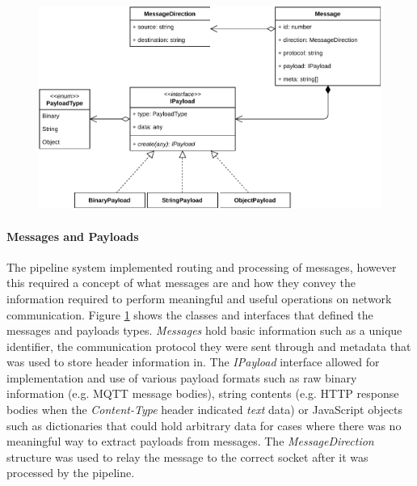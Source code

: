 \begin{figure}[h]
    \centering
    \includegraphics[width=14cm]{img/ch04/prototype/message-payload.pdf}
    \label{fig:prototype-message-payload}
\end{figure}
\paragraph{Messages and Payloads}
The pipeline system implemented routing and processing of messages, however this required a concept of what messages are and how they convey the information required to perform meaningful and useful operations on network communication. Figure \ref{fig:prototype-message-payload} shows the classes and interfaces that defined the messages and payloads types. \emph{Messages} hold basic information such as a unique identifier, the communication protocol they were sent through and metadata that was used to store header information in. The \emph{IPayload} interface allowed for implementation and use of various payload formats such as raw binary information (e.g. \ac{MQTT} message bodies), string contents (e.g. \ac{HTTP} response bodies when the \emph{Content-Type} header indicated \emph{text} data) or JavaScript objects such as dictionaries that could hold arbitrary data for cases where there was no meaningful way to extract payloads from messages. The \emph{MessageDirection} structure was used to relay the message to the correct socket after it was processed by the pipeline.

